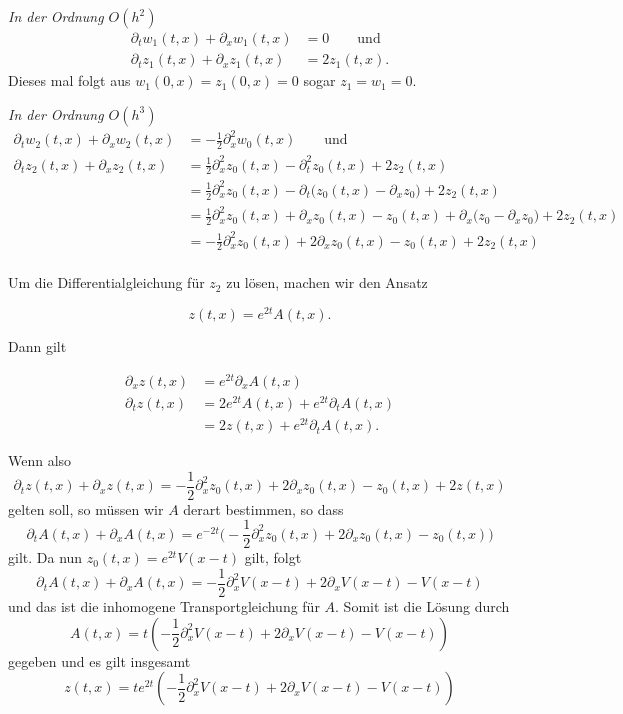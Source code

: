 \vspace{0.4cm}
\noindent \emph{In der Ordnung $O(h^2)$}
\begin{align*}
\partial_t w_1(t, x) + \partial_x w_1(t, x) &= 0 \qquad \text{und}\\
\partial_t z_1(t, x) + \partial_x z_1(t, x) &= 2 z_1(t, x).
\end{align*}
Dieses mal folgt aus $w_1(0,x) = z_1(0,x) = 0$ sogar $z_1 = w_1 = 0$.

\vspace{0.4cm}
\noindent \emph{In der Ordnung $O(h^3)$}
\begin{align*}
\partial_t w_2(t, x) + \partial_x w_2(t, x) &= - \frac{1}{2} \partial^2_x w_0(t, x) \qquad \text{und}\\
\partial_t z_2(t, x) + \partial_x z_2(t, x) &= \frac{1}{2} \partial^2_x z_0(t, x) - \partial^2_t z_0(t, x) + 2 z_2(t, x)\\
&= \frac{1}{2} \partial^2_x z_0(t, x) - \partial_t \bigl( z_0(t, x) - \partial_x z_0 \bigr) + 2 z_2(t, x)\\
&= \frac{1}{2} \partial^2_x z_0(t, x) + \partial_x z_0(t, x) - z_0(t, x) + \partial_x \bigl( z_0 - \partial_x z_0 \bigr) + 2 z_2(t, x)\\
&= - \frac{1}{2} \partial^2_x z_0(t, x) + 2 \partial_x z_0(t, x) - z_0(t, x) + 2 z_2(t, x)\\
\end{align*}

Um die Differentialgleichung für $z_2$ zu lösen, machen wir den Ansatz

\[ z(t,x) = e^{2t} A(t,x). \]

Dann gilt

\begin{align*}
\partial_x z(t,x) &= e^{2t} \partial_x A(t,x)\\
\partial_t z(t,x) &= 2 e^{2t} A(t,x) + e^{2t} \partial_t A(t, x)\\
                  &= 2 z(t, x) + e^{2t} \partial_t A(t, x).
\end{align*}

Wenn also
\[ \partial_t z(t, x) + \partial_x z(t, x) = - \frac{1}{2} \partial^2_x z_0(t, x) + 2 \partial_x z_0(t, x) - z_0(t, x) + 2 z(t, x) \]
gelten soll, so müssen wir $A$ derart bestimmen, so dass
\[ \partial_t A(t, x) + \partial_x A(t,x) = e^{-2t} \bigl( - \frac{1}{2} \partial^2_x z_0(t, x) + 2 \partial_x z_0(t, x) - z_0(t, x) \bigr) \]
gilt. Da nun $z_0(t,x) = e^{2t} V(x - t)$ gilt, folgt
\[ \partial_t A(t, x) + \partial_x A(t,x) = - \frac{1}{2} \partial^2_x V(x - t) + 2 \partial_x V(x - t) - V(x - t) \]
und das ist die inhomogene Transportgleichung für $A$. Somit ist die Lösung durch
\[ A(t,x) = t \left( - \frac{1}{2} \partial^2_x V(x - t) + 2 \partial_x V(x - t) - V(x - t) \right) \]
gegeben und es gilt insgesamt
\[ z(t,x) = t e^{2t} \left( - \frac{1}{2} \partial^2_x V(x - t) + 2 \partial_x V(x - t) - V(x - t) \right) \]

